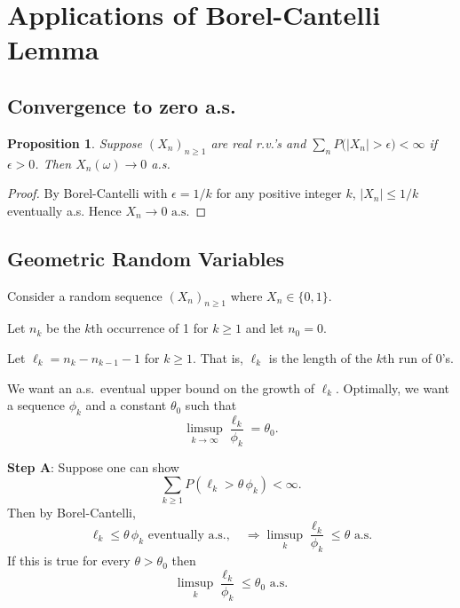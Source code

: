 \documentclass[a4paper]{amsart}
\theoremstyle{plain}
\newtheorem{proposition}[theorem]{Proposition}
\theoremstyle{definition}
\theoremstyle{remark}
\begin{document}
\section{Applications of Borel-Cantelli Lemma}

\subsection{Convergence to zero a.s.}

\begin{proposition} \label{appbc} Suppose $ (X_n)_{n\geq 1} $ are real r.v.'s and $ \sum_nP\big(|X_n|> \epsilon \big) < \infty $ if $ \epsilon > 0 $.  Then $ X_n( \omega ) \to 0 $ a.s.
\end{proposition}

\begin{proof} By Borel-Cantelli with $ \epsilon = 1/k $  for any positive integer $ k $,  
$ |X_n| \leq 1/k $  eventually  a.s.  
Hence  $  X_n \to 0 \text{ a.s.} $ 
\end{proof} 

\subsection{Geometric Random Variables}
Consider a random sequence $ (X_n)_{n\geq 1} $ where $ X_n \in \{0,1\} $.

Let $ n_k $ be the $ k $th occurrence of 1 for $ k\geq 1 $ and let $ n_0 = 0 $.

Let $ \ell_k = n_k - n_{k-1} -1$  for $ k \geq 1 $.  That is, $ \ell_k $ is the length of the $ k $th run of   0's.  

\medskip We want an a.s.\ eventual upper bound on the growth of $ \ell_k $.
Optimally, we want a sequence $ \phi_k $ and a constant $ \theta_0 $ such that  
\begin{equation} \label{lse}  
\limsup_{k\to \infty } \frac{\ell_k}{\phi_k} = \theta_0.
\end{equation} 

\medskip \noindent \textbf{Step A}:  Suppose one can show
\[ 
\sum_{k\geq 1} P (\ell_k > \theta\, \phi_k) < \infty.
\]
 Then by Borel-Cantelli,
 \[
 \ell_k \leq  \theta\, \phi_k \text{ eventually a.s.},\quad \Longrightarrow  \limsup_k \frac{\ell_k}{\phi_k} \leq \theta   \text{ a.s.} 
 \]
If this is true for every $ \theta > \theta_0$ then 
\[
\limsup_k \frac{\ell_k}{\phi_k} \leq \theta_0   \text{ a.s.}
\]
\end{document}

